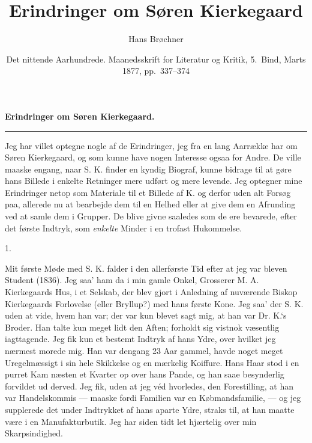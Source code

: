 \documentclass[12pt,a4paper,openany]{book}
\title{\textbf{Erindringer om Søren Kierkegaard}}
\author{Hans Brøchner}
\date{Det nittende Aarhundrede. Maanedsskrift for Literatur og Kritik,
  5.\ Bind, Marts 1877, pp.~337--374}
\newcommand{\secnum}[1]{\par\begin{center}#1\end{center}\par\nobreak}
\newcommand{\opage}[1]{\marginnote{\footnotesize\textit{[#1]}}}
\begin{document}
\maketitle
\thispagestyle{empty}
\clearpage

\begin{center}\textbf{\large \opage{337}Erindringer om Søren Kierkegaard.}\\[4pt]\rule{2cm}{0.4pt}\end{center}

Jeg har villet optegne nogle af de Erindringer, jeg
fra en lang Aarrække har om Søren Kierkegaard, og
som kunne have nogen Interesse ogsaa for Andre. De
ville maaske engang, naar S. K. finder en kyndig Biograf,
kunne bidrage til at gøre hans Billede i enkelte Retninger
mere udført og mere levende. Jeg optegner mine
Erindringer netop som Materiale til et Billede af K. og
derfor uden alt Forsøg paa, allerede nu at bearbejde
dem til en Helhed eller at give dem en Afrunding ved
at samle dem i Grupper. De blive givne saaledes som
de ere bevarede, efter det første Indtryk, som \emph{enkelte}
Minder i en trofast Hukommelse.

\secnum{1.}

Mit første Møde med S. K. falder i den allerførste
Tid efter at jeg var bleven Student (1836). Jeg saa’
ham da i min gamle Onkel, Grosserer M. A. Kierkegaards
Hus, i et Selskab, der blev gjort i Anledning af nuværende
Biskop Kierkegaards Forlovelse (eller Bryllup?) med hans
første Kone. Jeg saa’ der S. K. uden at vide, hvem
han var; der var kun blevet sagt mig, at han var Dr.
K.‘s Broder. Han talte kun meget lidt den Aften; forholdt
sig vistnok væsentlig iagttagende. Jeg fik kun et
\opage{338}bestemt Indtryk af hans Ydre, over hvilket jeg nærmest
morede mig. Han var dengang 23 Aar gammel, havde
noget meget Uregelmæssigt i sin hele Skikkelse og en
mærkelig Koiffure. Hans Haar stod i en purret Kam
næsten et Kvarter op over hans Pande, og han saae
besynderlig forvildet ud derved. Jeg fik, uden at jeg
véd hvorledes, den Forestilling, at han var Handelskommis
--- maaske fordi Familien var en Købmandsfamilie, ---
og jeg supplerede det under Indtrykket af hans aparte
Ydre, straks til, at han maatte være i en Manufakturbutik.
Jeg har siden tidt let hjærtelig over min Skarpsindighed.
\end{document}
